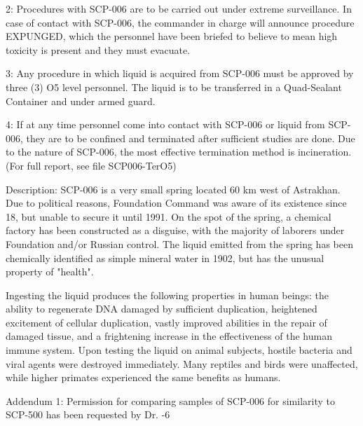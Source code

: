 2: Procedures with SCP-006 are to be carried out under extreme surveillance. In case of contact with SCP-006, the commander in charge will announce procedure \lb EXPUNGED\rb, which the personnel have been briefed to believe to mean high toxicity is present and they must evacuate.

3: Any procedure in which liquid is acquired from SCP-006 must be approved by three (3) O5 level personnel. The liquid is to be transferred in a Quad-Sealant Container and under armed guard.

4: If at any time personnel come into contact with SCP-006 or liquid from SCP-006, they are to be confined and terminated after sufficient studies are done. Due to the nature of SCP-006, the most effective termination method is incineration. (For full report, see file SCP006-TerO5)

Description: SCP-006 is a very small spring located 60 km west of Astrakhan. Due to political reasons, Foundation Command was aware of its existence since 18, but unable to secure it until 1991. On the spot of the spring, a chemical factory has been constructed as a disguise, with the majority of laborers under Foundation and/or Russian control. The liquid emitted from the spring has been chemically identified as simple mineral water in 1902, but has the unusual property of "health".

Ingesting the liquid produces the following properties in human beings: the ability to regenerate DNA damaged by sufficient duplication, heightened excitement of cellular duplication, vastly improved abilities in the repair of damaged tissue, and a frightening increase in the effectiveness of the human immune system. Upon testing the liquid on animal subjects, hostile bacteria and viral agents were destroyed immediately. Many reptiles and birds were unaffected, while higher primates experienced the same benefits as humans.

Addendum 1: Permission for comparing samples of SCP-006 for similarity to SCP-500 has been requested by Dr. -6